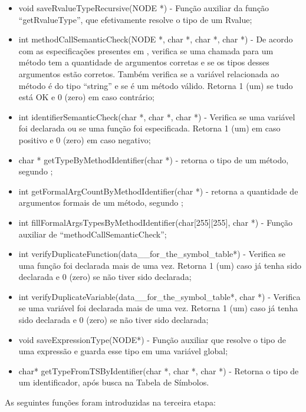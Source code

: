 \documentclass[12pt]{article}
\begin{document}
\begin{itemize}
	\item void saveRvalueTypeRecursive(NODE *) - Função auxiliar da função ``getRvalueType'', que efetivamente resolve o tipo de um Rvalue;
	\item int methodCallSemanticCheck(NODE *, char *, char *, char *) - De acordo com as especificações presentes em \cite{clrs09}, verifica se uma chamada para um método tem a quantidade de argumentos corretas e se os tipos desses argumentos estão corretos. Também verifica se a variável relacionada ao método é do tipo ``string'' e se é um método válido. Retorna 1 (um) se tudo está OK e 0 (zero) em caso contrário;
	\item int identifierSemanticCheck(char *, char *, char *) - Verifica se uma variável foi declarada ou se uma função foi especificada. Retorna 1 (um) em caso positivo e 0 (zero) em caso negativo;
	\item char * getTypeByMethodIdentifier(char *) - retorna o tipo de um método, segundo \cite{clrs09};
	\item int getFormalArgCountByMethodIdentifier(char *) - retorna a quantidade de argumentos formais de um método, segundo \cite{clrs09};
	\item int fillFormalArgsTypesByMethodIdentifier(char[255][255], char *) - Função auxiliar de ``methodCallSemanticCheck'';
	\item int verifyDuplicateFunction(data\_\_for\_the\_symbol\_table*) - Verifica se uma função foi declarada mais de uma vez. Retorna 1 (um) caso já tenha sido declarada e 0 (zero) se não tiver sido declarada;
	\item int verifyDuplicateVariable(data\_\_for\_the\_symbol\_table*, char *) - Verifica se uma variável foi declarada mais de uma vez. Retorna 1 (um) caso já tenha sido declarada e 0 (zero) se não tiver sido declarada;
	\item void saveExpressionType(NODE*) - Função auxiliar que resolve o tipo de uma expressão e guarda esse tipo em uma variável global;
	\item char* getTypeFromTSByIdentifier(char *, char *, char *) - Retorna o tipo de um identificador, após busca na Tabela de Símbolos.
\end{itemize}

As seguintes funções foram introduzidas na terceira etapa:
\end{document}
